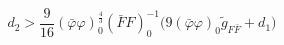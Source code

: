 \begin{equation}
    d_2 > \frac{9}{16} (\bar{\varphi} \varphi)_0^{\frac{4}{3}} (\bar{F}
    F)_0^{-1} \bigl( 9 (\bar{\varphi}
    \varphi)_0 \tilde{g}_{F \bar{F}} + d_1 \bigr)
  \end{equation}

